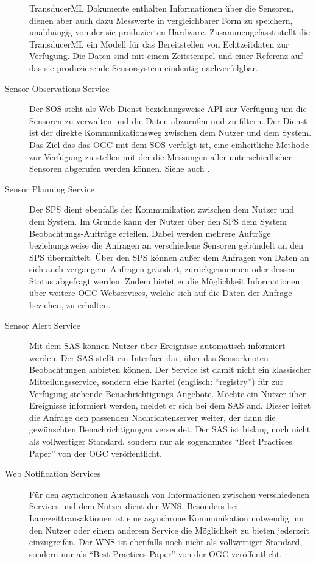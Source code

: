 \begin{description}
\gls{TransducerML} Dokumente enthalten Informationen über die Sensoren, dienen aber auch dazu Messwerte in vergleichbarer Form zu speichern, unabhängig von der sie produzierten Hardware. Zusammengefasst stellt die \gls{TransducerML} ein Modell für das Bereitstellen von Echtzeitdaten zur Verfügung. Die Daten sind mit einem Zeitstempel und einer Referenz auf das sie produzierende Sensorsystem eindeutig nachverfolgbar.
\item[Sensor Observations Service] 
Der \gls{SOS} steht als Web-Dienst beziehungsweise \gls{API} zur Verfügung um die Sensoren zu verwalten und die Daten abzurufen und zu filtern. Der Dienst ist der direkte Kommunikationsweg zwischen dem Nutzer und dem System. Das Ziel das das \gls{OGC} mit dem \gls{SOS} verfolgt ist, eine einheitliche Methode zur Verfügung zu stellen mit der die Messungen aller unterschiedlicher Sensoren abgerufen werden können. Siehe auch \citep{na_sensor_2007}.
\item[Sensor Planning Service] Der \gls{SPS} dient ebenfalls der Kommunikation zwischen dem Nutzer und dem System. Im Grunde kann der Nutzer über den \gls{SPS} dem System Beobachtungs-Aufträge erteilen. Dabei werden mehrere Aufträge beziehungsweise die Anfragen an verschiedene Sensoren gebündelt an den \gls{SPS} übermittelt. Über den \gls{SPS} können außer dem Anfragen von Daten an sich auch vergangene Anfragen geändert, zurückgenommen oder dessen Status abgefragt werden. Zudem bietet er die Möglichkeit Informationen über weitere \gls{OGC} Webservices, welche sich auf die Daten der Anfrage beziehen, zu erhalten.
\item[Sensor Alert Service] Mit dem \gls{SAS} können Nutzer über Ereignisse automatisch informiert werden. Der \gls{SAS} stellt ein Interface dar, über das Sensorknoten Beobachtungen anbieten können. Der Service ist damit nicht ein klassischer Mitteilungsservice, sondern eine Kartei (englisch: ``registry'') für zur Verfügung stehende Benachrichtigungs-Angebote. Möchte ein Nutzer über Ereignisse informiert werden, meldet er sich bei dem \gls{SAS} and. Dieser leitet die Anfrage den passenden Nachrichtenserver weiter, der dann die gewünschten Benachrichtigungen versendet.  Der \gls{SAS} ist bislang noch nicht als vollwertiger Standard, sondern nur als sogenanntes ``Best Practices Paper'' von der \gls{OGC} veröffentlicht.
\item[Web Notification Services] Für den asynchronen Austausch von Informationen zwischen verschiedenen Services und dem Nutzer dient der \gls{WNS}. Besonders bei Langzeittransaktionen ist eine asynchrone Kommunikation notwendig um den Nutzer oder einem anderem Service die Möglichkeit zu bieten jederzeit einzugreifen. Der \gls{WNS} ist ebenfalls noch nicht als vollwertiger Standard, sondern nur als ``Best Practices Paper'' von der \gls{OGC} veröffentlicht.
\end{description}


